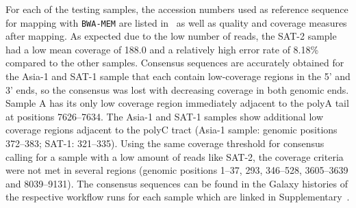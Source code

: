 For each of the testing samples, the accession numbers used as reference sequence for mapping with \texttt{BWA-MEM} are listed in~ as well as quality and coverage measures after mapping. As expected due to the low number of reads, the SAT-2 sample had a low mean coverage of {188.0\texttimes } and a relatively high error rate of 8.18\% compared to the other samples. Consensus sequences are accurately obtained for the Asia-1 and SAT-1 sample that each contain low-coverage regions in the 5' and 3' ends, so the consensus was lost with decreasing coverage in both genomic ends. Sample A has its only low coverage region immediately adjacent to the polyA tail at positions 7626--7634. The Asia-1 and SAT-1 samples show additional low coverage regions adjacent to the polyC tract (Asia-1 sample: genomic positions 372--383; SAT-1: 321--335). Using the same coverage threshold for consensus calling for a sample with a low amount of reads like SAT-2, the coverage criteria were not met in several regions (genomic positions 1--37, 293, 346--528, 3605--3639 and 8039--9131). The consensus sequences can be found in the Galaxy histories of the respective workflow runs for each sample which are linked in Supplementary~.

